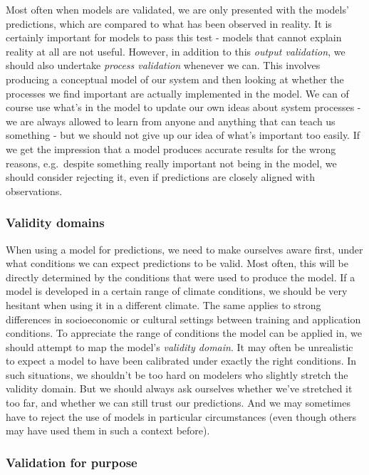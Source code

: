 \documentclass[
]{book}
\begin{document}
Most often when models are validated, we are only presented with the models' predictions, which are compared to what has been observed in reality. It is certainly important for models to pass this test - models that cannot explain reality at all are not useful. However, in addition to this \emph{output validation}, we should also undertake \emph{process validation} whenever we can. This involves producing a conceptual model of our system and then looking at whether the processes we find important are actually implemented in the model. We can of course use what's in the model to update our own ideas about system processes - we are always allowed to learn from anyone and anything that can teach us something - but we should not give up our idea of what's important too easily. If we get the impression that a model produces accurate results for the wrong reasons, e.g.~despite something really important not being in the model, we should consider rejecting it, even if predictions are closely aligned with observations.

\hypertarget{validity-domains}{%
\subsubsection{Validity domains}\label{validity-domains}}

When using a model for predictions, we need to make ourselves aware first, under what conditions we can expect predictions to be valid. Most often, this will be directly determined by the conditions that were used to produce the model. If a model is developed in a certain range of climate conditions, we should be very hesitant when using it in a different climate. The same applies to strong differences in socioeconomic or cultural settings between training and application conditions. To appreciate the range of conditions the model can be applied in, we should attempt to map the model's \emph{validity domain}. It may often be unrealistic to expect a model to have been calibrated under exactly the right conditions. In such situations, we shouldn't be too hard on modelers who slightly stretch the validity domain. But we should always ask ourselves whether we've stretched it too far, and whether we can still trust our predictions. And we may sometimes have to reject the use of models in particular circumstances (even though others may have used them in such a context before).

\hypertarget{validation-for-purpose}{%
\subsubsection{Validation for purpose}\label{validation-for-purpose}}
\end{document}
